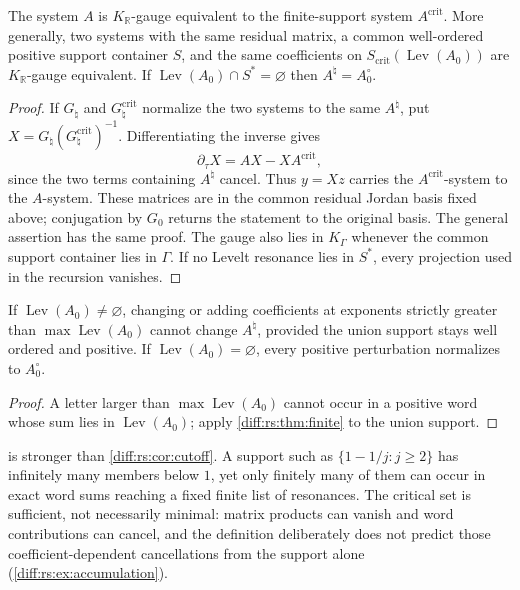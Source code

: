 \documentclass[11pt,letterpaper]{article}
\numberwithin{equation}{section}
\theoremstyle{definition}
\theoremstyle{remark}
\newcommand{\R}{\mathbb R}
\newcommand{\der}{\partial}
\newcommand{\derT}{\der_{\tau}}
\newcommand{\KR}{K_{\R}}
\newcommand{\Lev}{\operatorname{Lev}}
\newcommand{\crit}{\mathrm{crit}}
\begin{document}
\begin{corollary}
\label{diff:rs:cor:replacement}
The system $A$ is $\KR$-gauge equivalent to the finite-support system
$A^{\crit}$. More generally, two systems with the same residual matrix, a
common well-ordered positive support container $S$, and the same coefficients
on $S_{\crit}(\Lev(A_{0}))$ are $\KR$-gauge equivalent. If
$\Lev(A_{0})\cap S^{*}=\varnothing$ then $A^{\natural}=A_{0}^{\circ}$.
\end{corollary}
\begin{proof}
If $G_{\natural}$ and $G_{\natural}^{\crit}$ normalize the two systems to the
same $A^{\natural}$, put $X=G_{\natural}(G_{\natural}^{\crit})^{-1}$.
Differentiating the inverse gives
\[
 \derT X=AX-XA^{\crit},
\]
since the two terms containing $A^{\natural}$ cancel. Thus $y=Xz$
carries the $A^{\crit}$-system to the $A$-system. These matrices are in
the common residual Jordan basis fixed above; conjugation by $G_{0}$
returns the statement to the original basis. The general assertion has
the same proof. The gauge also lies in $K_{\Gamma}$ whenever the
common support container lies in $\Gamma$. If no Levelt resonance lies
in $S^{*}$, every projection used in the recursion vanishes.
\end{proof}

\begin{corollary}
\label{diff:rs:cor:cutoff}
If $\Lev(A_{0})\neq\varnothing$, changing or adding coefficients at exponents
strictly greater than $\max\Lev(A_{0})$ cannot change $A^{\natural}$, provided
the union support stays well ordered and positive. If
$\Lev(A_{0})=\varnothing$, every positive perturbation normalizes to
$A_{0}^{\circ}$.
\end{corollary}
\begin{proof}
A letter larger than $\max\Lev(A_{0})$ cannot occur in a positive word whose
sum lies in $\Lev(A_{0})$; apply \cref{diff:rs:thm:finite} to the union
support.
\end{proof}

 is stronger than \cref{diff:rs:cor:cutoff}. A
support such as $\{1-1/j:j\geq2\}$ has infinitely many members below $1$,
yet only finitely many of them can occur in exact word sums reaching a fixed
finite list of resonances. The critical set is sufficient, not necessarily
minimal: matrix products can vanish and word contributions can cancel, and the
definition deliberately does not predict those coefficient-dependent
cancellations from the support alone (\cref{diff:rs:ex:accumulation}).
\end{document}
